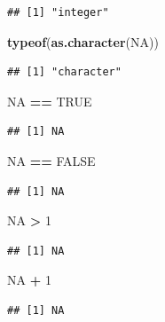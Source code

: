 \documentclass[
]{book}
\newenvironment{Shaded}{\begin{snugshade}}{\end{snugshade}}
\newcommand{\DecValTok}[1]{\textcolor[rgb]{0.00,0.00,0.81}{#1}}
\newcommand{\KeywordTok}[1]{\textcolor[rgb]{0.13,0.29,0.53}{\textbf{#1}}}
\newcommand{\NormalTok}[1]{#1}
\newcommand{\OperatorTok}[1]{\textcolor[rgb]{0.81,0.36,0.00}{\textbf{#1}}}
\newcommand{\OtherTok}[1]{\textcolor[rgb]{0.56,0.35,0.01}{#1}}
\newcommand{\StringTok}[1]{\textcolor[rgb]{0.31,0.60,0.02}{#1}}
\begin{document}
\begin{verbatim}
## [1] "integer"
\end{verbatim}

\begin{Shaded}
\begin{Highlighting}[]
\KeywordTok{typeof}\NormalTok{(}\KeywordTok{as.character}\NormalTok{(}\OtherTok{NA}\NormalTok{))}
\end{Highlighting}
\end{Shaded}

\begin{verbatim}
## [1] "character"
\end{verbatim}

\begin{Shaded}
\begin{Highlighting}[]
\OtherTok{NA} \OperatorTok{==}\StringTok{ }\OtherTok{TRUE}
\end{Highlighting}
\end{Shaded}

\begin{verbatim}
## [1] NA
\end{verbatim}

\begin{Shaded}
\begin{Highlighting}[]
\OtherTok{NA} \OperatorTok{==}\StringTok{ }\OtherTok{FALSE}
\end{Highlighting}
\end{Shaded}

\begin{verbatim}
## [1] NA
\end{verbatim}

\begin{Shaded}
\begin{Highlighting}[]
\OtherTok{NA} \OperatorTok{>}\StringTok{ }\DecValTok{1}
\end{Highlighting}
\end{Shaded}

\begin{verbatim}
## [1] NA
\end{verbatim}

\begin{Shaded}
\begin{Highlighting}[]
\OtherTok{NA} \OperatorTok{+}\StringTok{ }\DecValTok{1}
\end{Highlighting}
\end{Shaded}

\begin{verbatim}
## [1] NA
\end{verbatim}
\end{document}
